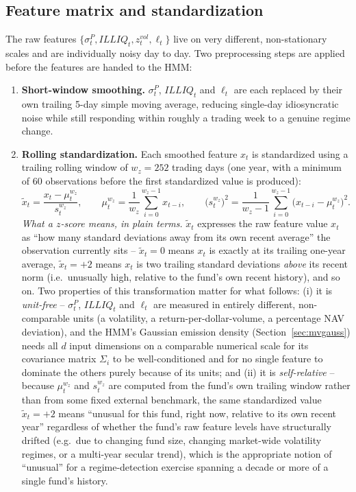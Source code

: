 \documentclass[11pt]{article}
\theoremstyle{definition}
\theoremstyle{remark}
\begin{document}
\subsection{Feature matrix and standardization}
\label{sec:feature-matrix}

The raw features $\{\sigma^P_t, ILLIQ_t, z^{vol}_t, \ell_t\}$ live on very different, non-stationary scales and are individually noisy day to day. Two preprocessing steps are applied before the features are handed to the HMM:

\begin{enumerate}
    \item \textbf{Short-window smoothing.} $\sigma^P_t$, $ILLIQ_t$ and $\ell_t$ are each replaced by their own trailing 5-day simple moving average, reducing single-day idiosyncratic noise while still responding within roughly a trading week to a genuine regime change.
    \item \textbf{Rolling standardization.} Each smoothed feature $x_t$ is standardized using a trailing rolling window of $w_z=252$ trading days (one year, with a minimum of 60 observations before the first standardized value is produced):
    \[
    \widetilde{x}_t = \frac{x_t - \mu_t^{w_z}}{s_t^{w_z}}, \qquad
    \mu_t^{w_z}=\frac{1}{w_z}\sum_{i=0}^{w_z-1}x_{t-i}, \qquad
    \big(s_t^{w_z}\big)^2=\frac{1}{w_z-1}\sum_{i=0}^{w_z-1}\big(x_{t-i}-\mu_t^{w_z}\big)^2.
    \]
    \emph{What a $z$-score means, in plain terms.} $\widetilde{x}_t$ expresses the raw feature value $x_t$ as ``how many standard deviations away from its own recent average'' the observation currently sits -- $\widetilde{x}_t=0$ means $x_t$ is exactly at its trailing one-year average, $\widetilde{x}_t=+2$ means $x_t$ is two trailing standard deviations \emph{above} its recent norm (i.e.\ unusually high, relative to the fund's own recent history), and so on. Two properties of this transformation matter for what follows: (i) it is \emph{unit-free} -- $\sigma^P_t$, $ILLIQ_t$ and $\ell_t$ are measured in entirely different, non-comparable units (a volatility, a return-per-dollar-volume, a percentage NAV deviation), and the HMM's Gaussian emission density (Section~\ref{sec:mvgauss}) needs all $d$ input dimensions on a comparable numerical scale for its covariance matrix $\Sigma_i$ to be well-conditioned and for no single feature to dominate the others purely because of its units; and (ii) it is \emph{self-relative} -- because $\mu_t^{w_z}$ and $s_t^{w_z}$ are computed from the fund's own trailing window rather than from some fixed external benchmark, the same standardized value $\widetilde x_t=+2$ means ``unusual for this fund, right now, relative to its own recent year'' regardless of whether the fund's raw feature levels have structurally drifted (e.g.\ due to changing fund size, changing market-wide volatility regimes, or a multi-year secular trend), which is the appropriate notion of ``unusual'' for a regime-detection exercise spanning a decade or more of a single fund's history.
\end{enumerate}
\end{document}
